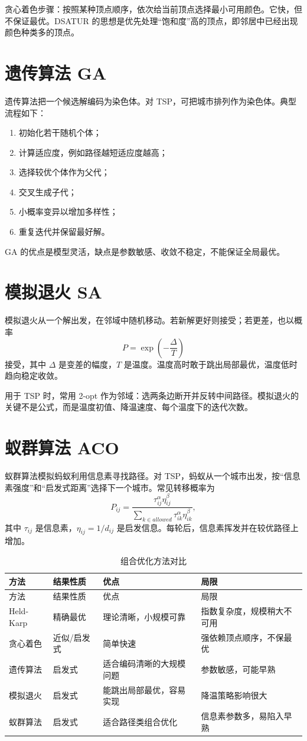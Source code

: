 \documentclass[UTF8,oneside,12pt]{ctexbook}
\begin{document}
贪心着色步骤：按照某种顶点顺序，依次给当前顶点选择最小可用颜色。它快，但不保证最优。DSATUR 的思想是优先处理“饱和度”高的顶点，即邻居中已经出现颜色种类多的顶点。

\section{遗传算法 GA}
遗传算法把一个候选解编码为染色体。对 TSP，可把城市排列作为染色体。典型流程如下：
\begin{enumerate}
  \item 初始化若干随机个体；
  \item 计算适应度，例如路径越短适应度越高；
  \item 选择较优个体作为父代；
  \item 交叉生成子代；
  \item 小概率变异以增加多样性；
  \item 重复迭代并保留最好解。
\end{enumerate}
GA 的优点是模型灵活，缺点是参数敏感、收敛不稳定，不能保证全局最优。

\section{模拟退火 SA}
模拟退火从一个解出发，在邻域中随机移动。若新解更好则接受；若更差，也以概率
\[
P=\exp\left(-\frac{\Delta}{T}\right)
\]
接受，其中 $\Delta$ 是变差的幅度，$T$ 是温度。温度高时敢于跳出局部最优，温度低时趋向稳定收敛。

用于 TSP 时，常用 2-opt 作为邻域：选两条边断开并反转中间路径。模拟退火的关键不是公式，而是温度初值、降温速度、每个温度下的迭代次数。

\section{蚁群算法 ACO}
蚁群算法模拟蚂蚁利用信息素寻找路径。对 TSP，蚂蚁从一个城市出发，按“信息素强度”和“启发式距离”选择下一个城市。常见转移概率为
\[
P_{ij}=\frac{\tau_{ij}^{\alpha}\eta_{ij}^{\beta}}{\sum_{k\in allowed}\tau_{ik}^{\alpha}\eta_{ik}^{\beta}},
\]
其中 $\tau_{ij}$ 是信息素，$\eta_{ij}=1/d_{ij}$ 是启发信息。每轮后，信息素挥发并在较优路径上增加。

\begin{longtable}{p{2.5cm}p{3.2cm}p{4.4cm}p{4.2cm}}
\caption{组合优化方法对比}\\
\toprule
方法 & 结果性质 & 优点 & 局限 \\
\midrule
\endfirsthead
\toprule
方法 & 结果性质 & 优点 & 局限 \\
\midrule
\endhead
Held-Karp & 精确最优 & 理论清晰，小规模可靠 & 指数复杂度，规模稍大不可用 \\
贪心着色 & 近似/启发式 & 简单快速 & 强依赖顶点顺序，不保最优 \\
遗传算法 & 启发式 & 适合编码清晰的大规模问题 & 参数敏感，可能早熟 \\
模拟退火 & 启发式 & 能跳出局部最优，容易实现 & 降温策略影响很大 \\
蚁群算法 & 启发式 & 适合路径类组合优化 & 信息素参数多，易陷入早熟 \\
\bottomrule
\end{longtable}
\end{document}

